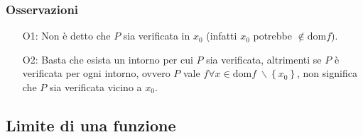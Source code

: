 \documentclass[a4paper]{article}
\newcommand\dom{\text{dom}}
\begin{document}
\subsubsection*{Osservazioni}
\begin{itemize}
	\item[O1:] Non è detto che \(P\) sia verificata in \(x_0\) (infatti \(x_0\) potrebbe \(\notin \dom f\)).
	\item[O2:] Basta che esista un intorno per cui \(P\) sia verificata, altrimenti se \(P\) è verificata per ogni intorno,
	ovvero \(P\) vale \(f\forall x \in \dom f \; \backslash \left\{ x_0 \right\}\), non significa che \(P\) sia verificata vicino a \(x_0\).
\end{itemize}


\subsection{Limite di una funzione}
\end{document}
